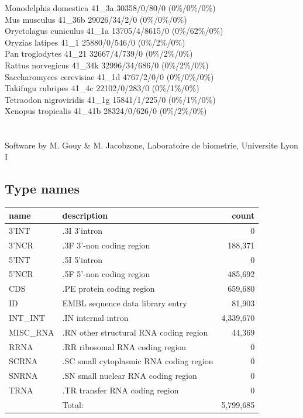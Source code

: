 \documentclass{article}
\begin{document}
\begin{Schunk}
Monodelphis domestica                   41\_3a 30358/0/80/0 (0\%/0\%/0\%)\\
Mus musculus                            41\_36b 29026/34/2/0 (0\%/0\%/0\%)\\
Oryctolagus cuniculus                   41\_1a 13705/4/8615/0 (0\%/62\%/0\%)\\
Oryzias latipes                         41\_1 25880/0/546/0 (0\%/2\%/0\%)\\
Pan troglodytes                         41\_21 32667/4/739/0 (0\%/2\%/0\%)\\
Rattus norvegicus                       41\_34k 32996/34/686/0 (0\%/2\%/0\%)\\
Saccharomyces cerevisiae                41\_1d 4767/2/0/0 (0\%/0\%/0\%)\\
Takifugu rubripes                       41\_4c 22102/0/283/0 (0\%/1\%/0\%)\\
Tetraodon nigroviridis                  41\_1g 15841/1/225/0 (0\%/1\%/0\%)\\
Xenopus tropicalis                      41\_41b 28324/0/626/0 (0\%/2\%/0\%)\\
\\
	     \\
Software by M. Gouy \& M. Jacobzone, Laboratoire de biometrie, Universite Lyon I 

\subsection{Type names}
\noindent\begin{tabular}{llr}
\hline \hline
name & description & count \\
\hline
3'INT  &  .3I 3'intron  &  0 \\
3'NCR  &  .3F  3'-non coding region  &  188,371 \\
5'INT  &  .5I 5'intron  &  0 \\
5'NCR  &  .5F  5'-non coding region  &  485,692 \\
CDS  &  .PE protein coding region  &  659,680 \\
ID  &  EMBL sequence data library entry  &  81,903 \\
INT\_INT  &  .IN  internal intron  &  4,339,670 \\
MISC\_RNA  &  .RN other structural RNA coding region  &  44,369 \\
RRNA  &  .RR ribosomal RNA coding region  &  0 \\
SCRNA  &  .SC small cytoplasmic RNA coding region  &  0 \\
SNRNA  &  .SN small nuclear RNA coding region  &  0 \\
TRNA  &  .TR transfer RNA coding region  &  0 \\
\hline
 & Total: & 5,799,685 \\
\hline \hline
\end{tabular}


\end{Schunk}
\end{document}
